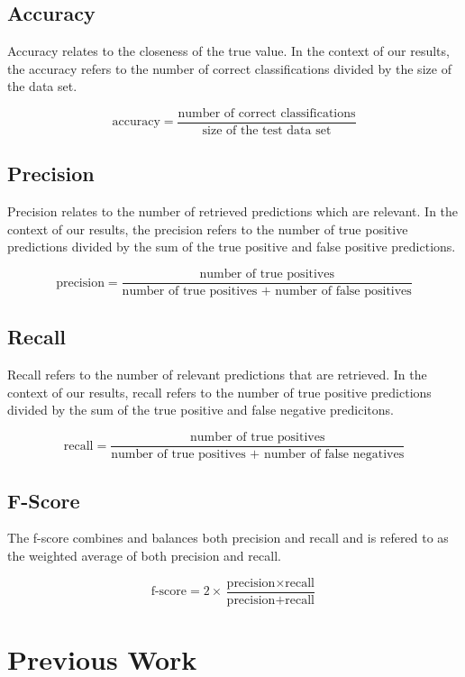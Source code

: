 \subsection{Accuracy}
\label{sec:accuracy}

Accuracy relates to the closeness of the true value. In the context of our results, the accuracy refers to the number of correct classifications 
divided by the size of the data set.

\[
 \text{accuracy} = \frac{\text{number of correct classifications}}{\text{size of the test data set}}
\]

\subsection{Precision}
\label{sec:precision}

Precision relates to the number of retrieved predictions which are relevant. In the context of our results, the precision refers to the number of true positive predictions 
divided by the sum of the true positive and false positive predictions.

\[
 \text{precision} = \frac{\text{number of true positives}}{\text{number of true positives + number of false positives}}
\]

\subsection{Recall}
\label{sec:recall}

Recall refers to the number of relevant predictions that are retrieved. In the context of our results, recall refers to the number of true positive predictions 
divided by the sum of the true positive and false negative predicitons.

\[
 \text{recall} = \frac{\text{number of true positives}}{\text{number of true positives + number of false negatives}}
\]

\subsection{F-Score}
\label{sec:fscore}

The f-score combines and balances both precision and recall and is refered to as the weighted average of both precision and recall. 

\[
 \text{f-score} = 2 \times \frac{\text{precision} \times \text{recall}}{\text{precision} + \text{recall}}
\]

\section{Previous Work}
\label{sec:pw}

